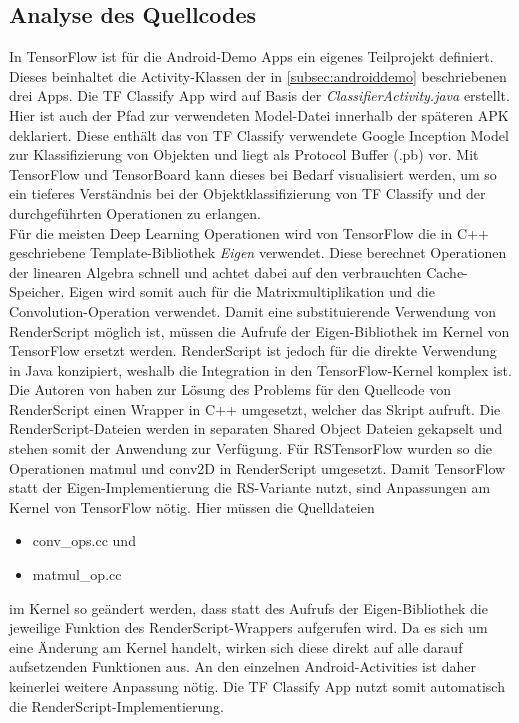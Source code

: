 \subsection{Analyse des Quellcodes}
\label{subsec:quellcodeanalyse}
In TensorFlow ist für die Android-Demo Apps ein eigenes Teilprojekt definiert. Dieses beinhaltet die Activity-Klassen der in \ref{subsec:androiddemo}  beschriebenen drei Apps. Die TF Classify App wird auf Basis der \textit{ClassifierActivity.java} erstellt. Hier ist auch der Pfad zur verwendeten Model-Datei innerhalb der späteren APK deklariert. Diese enthält das von TF Classify verwendete Google Inception Model zur Klassifizierung von Objekten und liegt als Protocol Buffer (.pb) vor. Mit TensorFlow und TensorBoard kann dieses bei Bedarf visualisiert werden, um so ein tieferes Verständnis bei der Objektklassifizierung von TF Classify und der durchgeführten Operationen zu erlangen. 
\\
Für die meisten Deep Learning Operationen wird von TensorFlow die in C++ geschriebene Template-Bibliothek \textit{Eigen} \cite{eigenlibrary} verwendet. Diese berechnet Operationen der linearen Algebra schnell und achtet dabei auf den verbrauchten Cache-Speicher. Eigen wird somit auch für die Matrixmultiplikation und die Convolution-Operation verwendet. Damit eine substituierende Verwendung von RenderScript möglich ist, müssen die Aufrufe der Eigen-Bibliothek im Kernel von TensorFlow ersetzt werden. RenderScript ist jedoch für die direkte Verwendung in Java konzipiert, weshalb die Integration in den TensorFlow-Kernel komplex ist. Die Autoren von \cite{rstensorflow2017} haben zur Lösung des Problems für den Quellcode von RenderScript einen Wrapper in C++ umgesetzt, welcher das Skript aufruft. Die RenderScript-Dateien werden in separaten Shared Object Dateien gekapselt und stehen somit der Anwendung zur Verfügung. Für RSTensorFlow wurden so die Operationen matmul und conv2D in RenderScript umgesetzt. Damit TensorFlow statt der Eigen-Implementierung die RS-Variante nutzt, sind Anpassungen am Kernel von TensorFlow nötig. Hier müssen die Quelldateien 
\begin{itemize}
	\item conv\_ops.cc und
	\item matmul\_op.cc
\end{itemize}
im Kernel so geändert werden, dass statt des Aufrufs der Eigen-Bibliothek die jeweilige Funktion des RenderScript-Wrappers aufgerufen wird. Da es sich um eine Änderung am Kernel handelt, wirken sich diese direkt auf alle darauf aufsetzenden Funktionen aus. An den einzelnen Android-Activities ist daher keinerlei weitere Anpassung nötig. Die TF Classify App nutzt somit automatisch die RenderScript-Implementierung. 

